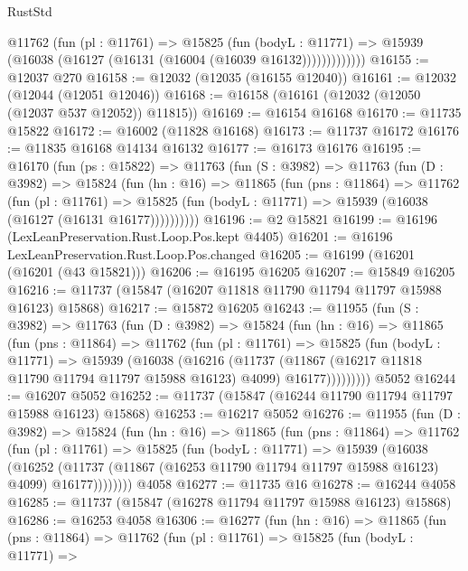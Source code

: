 \begin{lexlean}{RustStd}
\begin{coremodule}
              @11762
                (fun (pl : @11761) =>
                @15825
                  (fun (bodyL : @11771) =>
                  @15939 (@16038 (@16127 (@16131 (@16004 (@16039 @16132)))))))))))))
@16155 := @12037 @270
@16158 := @12032 (@12035 (@16155 @12040))
@16161 := @12032 (@12044 (@12051 @12046))
@16168 := @16158 (@16161 (@12032 (@12050 (@12037 @537 @12052)) @11815))
@16169 := @16154 @16168
@16170 := @11735 @15822
@16172 := @16002 (@11828 @16168)
@16173 := @11737 @16172
@16176 := @11835 @16168 @14134 @16132
@16177 := @16173 @16176
@16195 := @16170
    (fun (ps : @15822) =>
    @11763
      (fun (S : @3982) =>
      @11763
        (fun (D : @3982) =>
        @15824
          (fun (hn : @16) =>
          @11865
            (fun (pns : @11864) =>
            @11762
              (fun (pl : @11761) =>
              @15825 (fun (bodyL : @11771) => @15939 (@16038 (@16127 (@16131 @16177))))))))))
@16196 := @2 @15821
@16199 := @16196 (LexLeanPreservation.Rust.Loop.Pos.kept @4405)
@16201 := @16196 LexLeanPreservation.Rust.Loop.Pos.changed
@16205 := @16199 (@16201 (@16201 (@43 @15821)))
@16206 := @16195 @16205
@16207 := @15849 @16205
@16216 := @11737 (@15847 (@16207 @11818 @11790 @11794 @11797 @15988 @16123) @15868)
@16217 := @15872 @16205
@16243 := @11955
    (fun (S : @3982) =>
    @11763
      (fun (D : @3982) =>
      @15824
        (fun (hn : @16) =>
        @11865
          (fun (pns : @11864) =>
          @11762
            (fun (pl : @11761) =>
            @15825
              (fun (bodyL : @11771) =>
              @15939
                (@16038
                  (@16216
                    (@11737
                      (@11867 (@16217 @11818 @11790 @11794 @11797 @15988 @16123) @4099)
                      @16177)))))))))
    @5052
@16244 := @16207 @5052
@16252 := @11737 (@15847 (@16244 @11790 @11794 @11797 @15988 @16123) @15868)
@16253 := @16217 @5052
@16276 := @11955
    (fun (D : @3982) =>
    @15824
      (fun (hn : @16) =>
      @11865
        (fun (pns : @11864) =>
        @11762
          (fun (pl : @11761) =>
          @15825
            (fun (bodyL : @11771) =>
            @15939
              (@16038
                (@16252
                  (@11737 (@11867 (@16253 @11790 @11794 @11797 @15988 @16123) @4099) @16177))))))))
    @4058
@16277 := @11735 @16
@16278 := @16244 @4058
@16285 := @11737 (@15847 (@16278 @11794 @11797 @15988 @16123) @15868)
@16286 := @16253 @4058
@16306 := @16277
    (fun (hn : @16) =>
    @11865
      (fun (pns : @11864) =>
      @11762
        (fun (pl : @11761) =>
        @15825
          (fun (bodyL : @11771) =>

\end{coremodule}
\end{lexlean}
